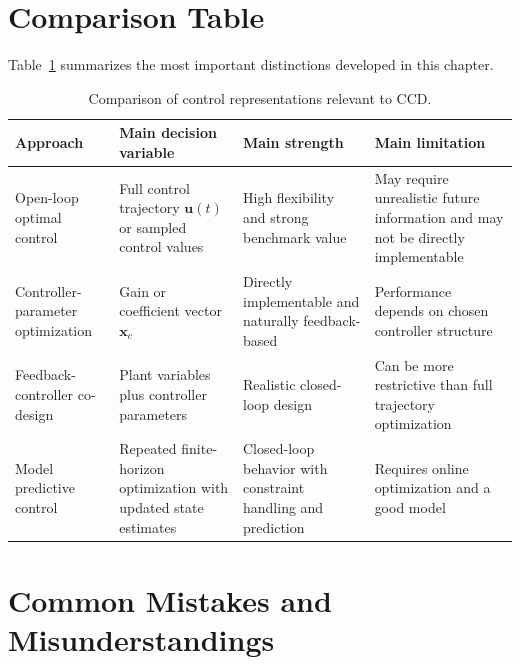 \documentclass[11pt]{article}
\newcommand{\vect}[1]{\boldsymbol{#1}}
\newcommand{\xc}{\vect{x}_c}
\newcommand{\uvec}{\vect{u}}
\begin{document}
\section{Comparison Table}

Table~\ref{tab:ch6-compare} summarizes the most important distinctions developed in this chapter.

\begin{table}[H]
\centering
\caption{Comparison of control representations relevant to CCD.}
\label{tab:ch6-compare}
\begin{tabular}{>{\raggedright\arraybackslash}p{2.9cm} >{\raggedright\arraybackslash}p{3.0cm} >{\raggedright\arraybackslash}p{3.2cm} >{\raggedright\arraybackslash}p{3.0cm}}
\toprule
Approach & Main decision variable & Main strength & Main limitation \\
\midrule
Open-loop optimal control & Full control trajectory $\uvec(t)$ or sampled control values & High flexibility and strong benchmark value & May require unrealistic future information and may not be directly implementable \\
Controller-parameter optimization & Gain or coefficient vector $\xc$ & Directly implementable and naturally feedback-based & Performance depends on chosen controller structure \\
Feedback-controller co-design & Plant variables plus controller parameters & Realistic closed-loop design & Can be more restrictive than full trajectory optimization \\
Model predictive control & Repeated finite-horizon optimization with updated state estimates & Closed-loop behavior with constraint handling and prediction & Requires online optimization and a good model \\
\bottomrule
\end{tabular}
\end{table}

\section{Common Mistakes and Misunderstandings}
\end{document}
